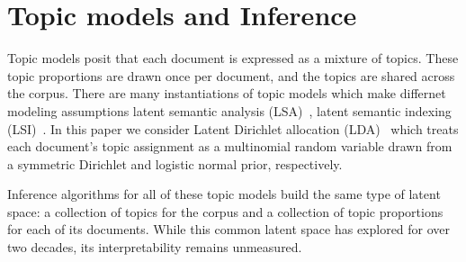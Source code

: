 \section{Topic models and Inference}
\label{sec:models}




Topic models posit that each document is expressed as a mixture of
topics.  These topic proportions are drawn once per document, and the
topics are shared across the corpus.  There are many instantiations of
topic models which make differnet modeling assumptions latent semantic
analysis (LSA)~\cite{landauer-97}, latent semantic indexing
(LSI)~\cite{deerwester-90}.  In this paper we consider Latent
Dirichlet allocation (LDA)~\cite{blei-03} which treats each document's
topic assignment as a multinomial random variable drawn from a
symmetric Dirichlet and logistic normal prior, respectively.

Inference algorithms for all of these topic models build the same type
of latent space: a collection of topics for the corpus and a
collection of topic proportions for each of its documents.  While this
common latent space has explored for over two decades, its
interpretability remains unmeasured.

